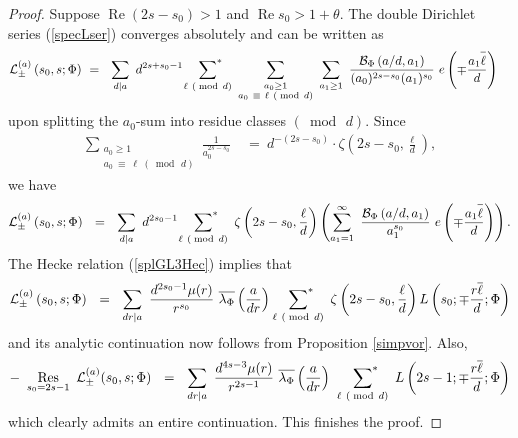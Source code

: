 \documentclass[11pt,reqno]{amsart}
\theoremstyle{definition}
\theoremstyle{definition}
\theoremstyle{remark}
\numberwithin{equation}{section}
\DeclareMathOperator{\re}{Re}
\DeclareMathOperator{\Res}{Res}
\newcommand{\ovA}[1]{\overline{#1\raisebox{3mm}{}}}
\begin{document}
\begin{proof}
Suppose  $\re (2s-s_{0})>1$ and $\re s_{0}> 1+\theta$. The double Dirichlet series (\ref{specLser}) converges  absolutely and can be written as
\begin{align}
	\mathcal{L}_{\pm}^{(a)}\left(s_{0}, s ; \Phi\right) \ &= \  
	\ \sum_{d \mid a} \  d^{2s+s_{0}-1} \ \sideset{}{^*}{\sum}_{\ell \ (\bmod\, d)} \ 
	\sum_{\substack{a_{0} \ge 1 \\ a_{0} \ \equiv \ \ell \ (\bmod\, d)}}  \ \sum_{a_{1}\ge 1}  \ \frac{\mathcal{B}_{\Phi}\left( a/d, a_{1}   \right)}{(a_{0})^{2s-s_{0}} (a_{1})^{s_{0}}} \   e\left( \mp \frac{a_{1}\ovA{\ell}}{d}\right)
\end{align}
upon splitting the $a_{0}$-sum into  residue classes $(\bmod\, d)$.  Since
\begin{align}\label{congHurw}
	\sum_{\substack{a_{0} \ge 1 \\ a_{0} \ \equiv \  \ell \ (\bmod\, d)}}  \frac{1}{a_{0}^{2s-s_{0}}} \ &= \  d^{-(2s-s_{0})}\cdot  \zeta\left( 2s-s_{0}, \frac{\ell}{d}\right),
\end{align}
we have
\begin{align}\label{prevorofor}
	\mathcal{L}_{\pm}^{(a)}\left(s_{0}, s; \Phi \right) \ \ = \ \   \sum_{d \mid a} \  d^{2s_{0}-1} \ \sideset{}{^*}{\sum}_{\ell \ (\bmod\, d)} \  \zeta\left( 2s-s_{0}, \frac{\ell}{d}\right)  \left( \sum_{a_{1}=1}^{\infty}  \ \frac{\mathcal{B}_{\Phi}\left( a/d,  a_{1}   \right)}{ a_{1}^{s_{0}}}\  e\left(\mp \frac{a_{1}\ovA{\ell}}{d}\right) \right). 
\end{align}
The Hecke relation  (\ref{splGL3Hec}) implies that
 \begin{align}\label{twistDS}
 	\mathcal{L}^{(a)}_{\pm}\left(s_{0}, s; \Phi \right)  \ \ = \ \    \sum_{dr \mid a} \   \frac{d^{2s_{0}-1} \mu(r)}{ r^{s_{0}} }\ \overline{\lambda_{\Phi}}\left( \frac{a}{dr}\right)  \  \sideset{}{^*}{\sum}_{\ell \ (\bmod\, d)} \  \zeta\left( 2s-s_{0}, \frac{\ell}{d}\right) 	L\left( s_{0}; \mp \frac{r\overline{\ell}}{d}; \Phi\right)
 \end{align}
and its analytic continuation now follows  from Proposition  \ref{simpvor}. Also, 
\begin{align}\label{restwisDS}
- \ 	\Res_{s_{0}=2s-1} \  \mathcal{L}_{\pm}^{(a)}(s_{0}, s; \Phi) \ \  =  \ \  \sum_{dr \mid a} \   \frac{d^{4s-3} \mu(r)}{ r^{2s-1} }\ \overline{\lambda_{\Phi}}\left( \frac{a}{dr}\right)  \ \  \sideset{}{^*}{\sum}_{\ell \ (\bmod\, d)} \ 	L\left(2s-1; \mp \frac{r\overline{\ell}}{d}; \Phi\right)
 \end{align}
which  clearly admits an entire continuation.  This finishes the proof. 
\end{proof}
\end{document}
